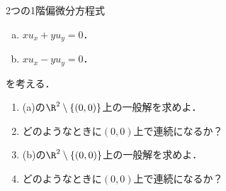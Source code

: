 \documentclass[uplatex,dvipdfmx]{jsarticle}
\begin{document}
\begin{problem}
    2つの1階偏微分方程式
    \begin{enumerate}[(a)]
        \item $xu_x+yu_y=0$．
        \item $xu_x-yu_y=0$．
    \end{enumerate}
    を考える．
    \begin{enumerate}
        \item (a)の$\R^2\setminus\{(0,0)\}$上の一般解を求めよ．
        \item どのようなときに$(0,0)$上で連続になるか？
        \item (b)の$\R^2\setminus\{(0,0)\}$上の一般解を求めよ．
        \item どのようなときに$(0,0)$上で連続になるか？
    \end{enumerate}
\end{problem}
\end{document}
